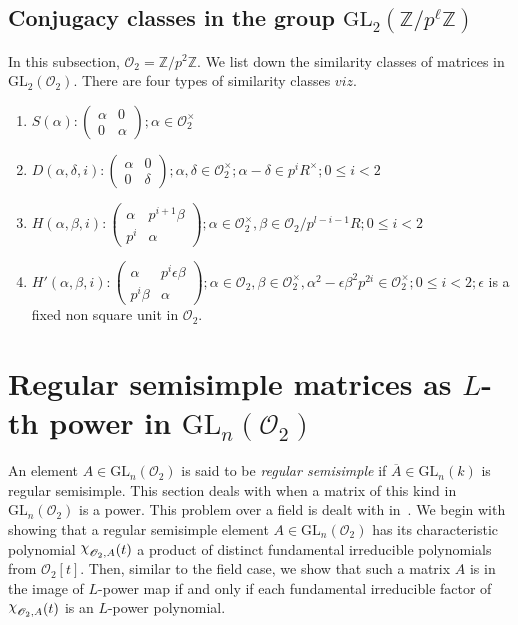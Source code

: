 \documentclass[11pt,twoside]{amsart}
\newcommand{\GL}{\mathrm{GL}}
\newcommand{\upchi}{\raisebox{0.4ex}{$\chi$}}
\newcommand{\Char}{\upchi}
\newcommand{\Z}{\mathbb{Z}}
\newcommand{\R}{\mathscr{O}_2}
\theoremstyle{definition} %
\begin{document}
\subsection{Conjugacy classes in the group $\mathrm{GL}_2(\Z/p^\ell\Z)$}\label{subsec:conj-gl}

In this subsection, $\R=\Z/p^2\Z$. We list down the similarity classes of matrices in $\GL_2(\R).$ There are four types of similarity classes $viz.$
\begin{enumerate}
\item $S(\alpha)  : \left( \begin{array}{cc} \alpha & 0 \\
0 & \alpha\end{array} \right);  \alpha\in \R^{\times}$
\item $D(\alpha,\delta,i)  :  \left( \begin{array}{cc} \alpha & 0 \\
0 & \delta\end{array} \right);   \alpha,\delta\in \R^{\times};\alpha-\delta\in p^iR^{\times}; 0\leq i<2$
\item $H(\alpha,\beta,i) :  \left( \begin{array}{cc} \alpha & p^{i+1}\beta \\
p^i & \alpha\end{array} \right); \alpha\in \R^{\times},\beta\in \R/p^{l-i-1}R; 0\leq i<2 $
\item $H'(\alpha,\beta,i)  :  \left( \begin{array}{cc} \alpha & p^i\epsilon\beta \\
p^i\beta & \alpha\end{array} \right); \alpha\in \R,\beta\in \R^{\times}, \alpha^2-\epsilon\beta^2p^{2i}\in \R^{\times}; 0\leq i<2; \epsilon$  is a fixed non square unit in $\R$.

\end{enumerate}


\section{Regular semisimple matrices as $L$-th power in $\mathrm{GL}_n(\R)$}\label{sec:separable}

An element $A\in \GL_n(\R)$ is said to be \emph{regular semisimple} if $\overline{A} \in\GL_n(k)$ is regular semisimple. This section deals with when a matrix of this kind in $\GL_n(\R)$ is a power. This problem over a field is dealt with in~\cite{KunduSinghGL}. We begin with showing that a regular semisimple element $A\in\GL_n(\R)$ has its characteristic polynomial $\Char_{\R, A}(t)$ a product of distinct fundamental irreducible polynomials from $\R[t]$. Then, similar to the field case, we show that such a matrix $A$ is in the image of $L$-power map if and only if each fundamental irreducible factor of $\Char_{\R, A}(t)$ is an $L$-power polynomial.
\end{document}
